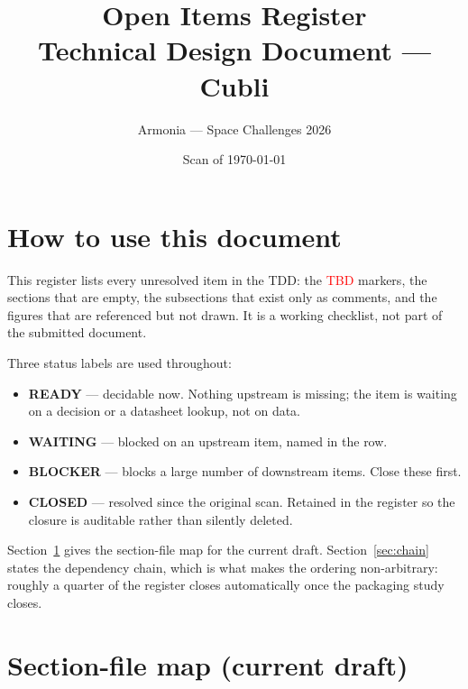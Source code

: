 \documentclass[11pt,a4paper]{article}
\title{\textbf{Open Items Register}\\[0.4em]\large Technical Design Document --- Cubli}
\author{Armonia --- Space Challenges 2026}
\date{Scan of \today}
\newcommand{\blocker}{\textcolor{blockcol}{\textbf{BLOCKER}}}
\newcommand{\ready}{\textcolor{readycol}{\textbf{READY}}}
\newcommand{\waiting}{\textcolor{waitcol}{\textbf{WAITING}}}
\newcommand{\closed}{\textcolor{closedcol}{\textbf{CLOSED}}}
\begin{document}
\maketitle
\thispagestyle{fancy}

\section*{How to use this document}

This register lists every unresolved item in the TDD: the \textcolor{red}{TBD}
markers, the sections that are empty, the subsections that exist only as
comments, and the figures that are referenced but not drawn. It is a working
checklist, not part of the submitted document.

Three status labels are used throughout:

\begin{itemize}
  \item \ready{} --- decidable now. Nothing upstream is missing; the item is
        waiting on a decision or a datasheet lookup, not on data.
  \item \waiting{} --- blocked on an upstream item, named in the row.
  \item \blocker{} --- blocks a large number of downstream items. Close these
        first.
  \item \closed{} --- resolved since the original scan. Retained in the register
        so the closure is auditable rather than silently deleted.
\end{itemize}

Section~\ref{sec:filemap} gives the section-file map for the current draft.
Section~\ref{sec:chain} states the dependency chain, which is what makes the
ordering non-arbitrary: roughly a quarter of the register closes automatically
once the packaging study closes.

\section{Section-file map (current draft)}
\label{sec:filemap}
\end{document}
